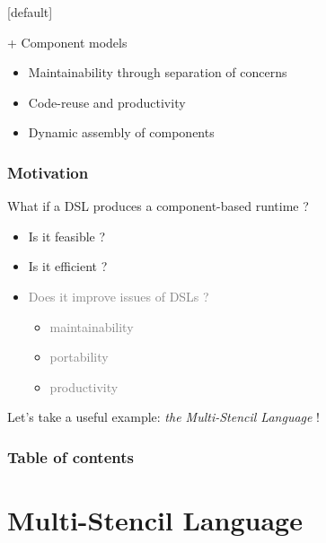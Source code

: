 \documentclass{beamer}
\makeatletter
\newenvironment{withoutheadline}{
        \setbeamertemplate{headline}[default]
        \def\beamer@entrycode{\vspace*{-\headheight}}
    }{}
\makeatother
\begin{document}
\begin{withoutheadline}
\begin{frame}
\begin{block}{+ Component models}
\begin{itemize}
\item Maintainability through separation of concerns
\item Code-reuse and productivity
\item Dynamic assembly of components
\end{itemize}
\end{block}
\end{frame}
\begin{frame}
\frametitle{Motivation} %
What if a DSL produces a component-based runtime ?

\begin{itemize}
\item Is it feasible ?
\item Is it efficient ?
\item \textcolor{gray}{Does it improve issues of DSLs ?}
\begin{itemize}
\item \textcolor{gray}{maintainability}
\item \textcolor{gray}{portability}
\item \textcolor{gray}{productivity}
\end{itemize}
\end{itemize}

Let's take a useful example: \textit{the Multi-Stencil Language }!
\end{frame}

\begin{frame}
\frametitle{Table of contents}
    \tableofcontents[hideallsubsections]
\end{frame}

\end{withoutheadline}

\section{Multi-Stencil Language}
\end{document}
